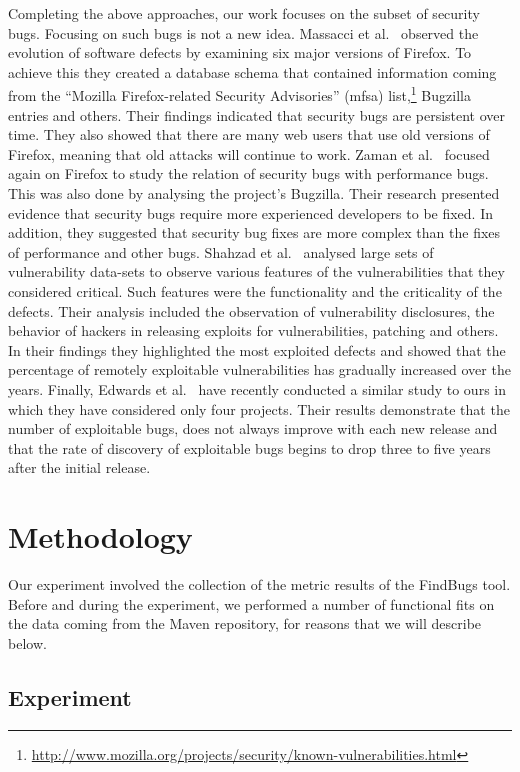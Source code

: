\documentclass{sig-alternate}
\begin{document}
Completing the above approaches, our work focuses on the subset of security bugs.
Focusing on such bugs is not a new idea. Massacci et al.~\cite{MNN11} observed
the evolution of software defects by examining six major versions of Firefox.
To achieve this they created a database schema that contained information
coming from the ``Mozilla Firefox-related Security Advisories'' ({\sc mfsa})
list,\footnote{\url{http://www.mozilla.org/projects/security/known-vulnerabilities.html}}
Bugzilla entries and others. Their findings indicated that security bugs are
persistent over time. They also showed that there are many web users that use
old versions of Firefox, meaning that old attacks will continue to work.
Zaman et al.~\cite{ZAH11} focused again on Firefox to study the relation of
security bugs with performance bugs. This was also done by analysing the project's
Bugzilla. Their research presented evidence that security bugs require more experienced developers
to be fixed. In addition, they suggested that security bug fixes are more complex than the
fixes of performance and other bugs.
Shahzad et al.~\cite{SSL12} analysed large sets of vulnerability data-sets to observe
various features of the vulnerabilities that they considered critical. Such features
were the functionality and the criticality of the defects. Their analysis
included the observation of vulnerability disclosures, the behavior of
hackers in releasing exploits for vulnerabilities, patching and others. In
their findings they highlighted the most exploited defects and showed that
the percentage of remotely exploitable vulnerabilities has gradually increased
over the years. Finally, Edwards et al.~\cite{EC12} have recently conducted
a similar study to ours in which they have considered only four projects.
Their results demonstrate that the number of exploitable bugs, does not
always improve with each new release and that the rate of discovery of
exploitable bugs begins to drop three to five years after the
initial release.

\section{Methodology}
\label{sec:meth}

Our experiment involved the collection of the metric results of the FindBugs
tool. Before and during the experiment, we performed a number of functional
fits on the data coming from the Maven repository, for reasons that we will describe below.

\subsection{Experiment}
\label{sec:exp}
\end{document}
